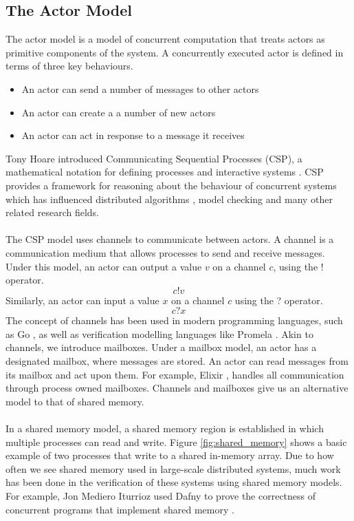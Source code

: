 \subsection{The Actor Model}
The actor model \cite{actors} is a model of concurrent computation that treats actors as primitive components of the system. A concurrently executed actor is defined in terms of three key behaviours.
\begin{itemize}
    \item An actor can send a number of messages to other actors
    \item An actor can create a a number of new actors
    \item An actor can act in response to a message it receives
\end{itemize}
Tony Hoare introduced Communicating Sequential Processes (CSP), a mathematical notation for defining processes and interactive systems \cite{csp_paper}. CSP provides a framework for reasoning about the behaviour of concurrent systems which has influenced distributed algorithms \cite{distributed_algorithms_na_lynch}, model checking \cite{model_checking} and many other related research fields.
\\ \\
The CSP model uses channels to communicate between actors. A channel is a communication medium that allows processes to send and receive messages. Under this model, an actor can output a value $v$ on a channel $c$, using the ! operator.
\[
c!v
\]
Similarly, an actor can input a value $x$ on a channel $c$ using the ? operator.
\[
c?x
\]
The concept of channels has been used in modern programming languages, such as Go \cite{go}, as well as verification modelling languages like Promela \cite{promela}. Akin to channels, we introduce mailboxes. Under a mailbox model, an actor has a designated mailbox, where messages are stored. An actor can read messages from its mailbox and act upon them. For example, Elixir \cite{elixir}, handles all communication through process owned mailboxes. Channels and mailboxes give us an alternative model to that of shared memory.
\\ \\
In a shared memory model, a shared memory region is established in which multiple processes can read and write. Figure \ref{fig:shared_memory} shows a basic example of two processes that write to a shared in-memory array. Due to how often we see shared memory used in large-scale distributed systems, much work has been done in the verification of these systems using shared memory models. For example, Jon Mediero Iturrioz used Dafny \cite{dafny} to prove the correctness of concurrent programs that implement shared memory \cite{shared_memory_verification}. 
